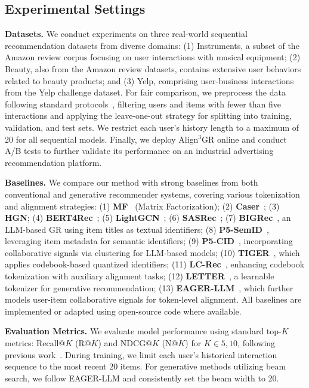\documentclass[letterpaper]{article} %
\begin{document}
\subsection{Experimental Settings}
\textbf{Datasets.} We conduct experiments on three real-world sequential recommendation datasets from diverse domains: (1) Instruments, a subset of the Amazon review corpus focusing on user interactions with musical equipment; (2) Beauty, also from the Amazon review datasets, contains extensive user behaviors related to beauty products; and (3) Yelp, comprising user-business interactions from the Yelp challenge dataset. For fair comparison, we preprocess the data following standard protocols~\cite{lc-rec, tiger, letter}, filtering users and items with fewer than five interactions and applying the leave-one-out strategy for splitting into training, validation, and test sets. We restrict each user's history length to a maximum of 20 for all sequential models.  Finally, we deploy Align$^3$GR online and conduct A/B tests to further validate its performance on an industrial advertising recommendation platform.
%

%
\textbf{Baselines.} We compare our method with strong baselines from both conventional and generative recommender systems, covering various tokenization and alignment strategies:
(1) \textbf{MF}~\cite{mf} (Matrix Factorization); (2) \textbf{Caser}~\cite{caser}; (3) \textbf{HGN}\cite{hgn}; (4) \textbf{BERT4Rec}~\cite{bert4rec}; (5) \textbf{LightGCN}~\cite{lightgcn}; (6) \textbf{SASRec}~\cite{sasrec};
(7) \textbf{BIGRec}~\cite{bigrec}, an LLM-based GR using item titles as textual identifiers;
(8) \textbf{P5-SemID}~\cite{letter}, leveraging item metadata for semantic identifiers;
(9) \textbf{P5-CID}~\cite{letter}, incorporating collaborative signals via clustering for LLM-based models;
(10) \textbf{TIGER}~\cite{tiger}, which applies codebook-based quantized identifiers;
(11) \textbf{LC-Rec}~\cite{lc-rec}, enhancing codebook tokenization with auxiliary alignment tasks;
(12) \textbf{LETTER}~\cite{letter}, a learnable tokenizer for generative recommendation;
(13) \textbf{EAGER-LLM}~\cite{eager-llm}, which further models user-item collaborative signals for token-level alignment.
All baselines are implemented or adapted using open-source code where available.
%

%
\textbf{Evaluation Metrics.} We evaluate model performance using standard top-$K$ metrics: Recall@$K$ (R@$K$) and NDCG@$K$ (N@$K$) for $K\in{5, 10}$, following previous work~\cite{tiger, lc-rec,eager-llm}. During training, we limit each user’s historical interaction sequence to the most recent 20 items. For generative methods utilizing beam search, we follow EAGER-LLM and consistently set the beam width to 20.
%
\end{document}

